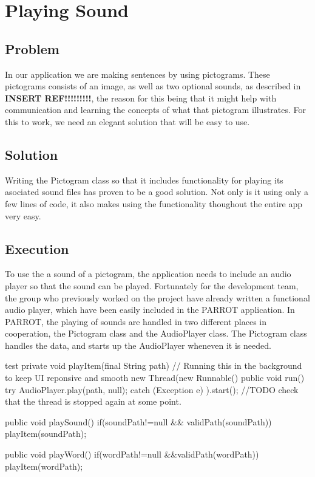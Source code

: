 \section{Playing Sound}
\subsection{Problem}
In our application we are making sentences by using pictograms. These pictograms consists of an image, as well as two optional sounds, as described in \textbf{INSERT REF!!!!!!!!!}, the reason for this being that it might help with communication and learning the concepts of what that pictogram illustrates.\newline
For this to work, we need an elegant solution that will be easy to use.

\subsection{Solution}
Writing the Pictogram class so that it includes functionality for playing its asociated sound files has proven to be a good solution. Not only is it using only a few lines of code, it also makes using the functionality thoughout the entire app very easy.

\subsection{Execution}
To use the a sound of a pictogram, the application needs to include an audio player so that the sound can be played. Fortunately for the development team, the group who previously worked on the project have already written a functional audio player, which have been easily included in the PARROT application.\newline
In PARROT, the playing of sounds are handled in two different places in cooperation, the Pictogram class and the AudioPlayer class.\newline
The Pictogram class handles the data, and starts up the AudioPlayer wheneven it is needed.\newline

\begin{source}{test}{}
	private void playItem(final String path) {
		// Running this in the background to keep UI reponsive and smooth
		new Thread(new Runnable() {
			public void run() {
				try {
					AudioPlayer.play(path, null);
				} catch (Exception e) {
				}
			}
		}).start();
		//TODO check that the thread is stopped again at some point.
	}

	public void playSound()
	{
		if(soundPath!=null && validPath(soundPath))
		{
			playItem(soundPath);
		}
	}

	public void playWord()
	{
		if(wordPath!=null &&validPath(wordPath))
		{
			playItem(wordPath);
		}
	}
\end{source}

